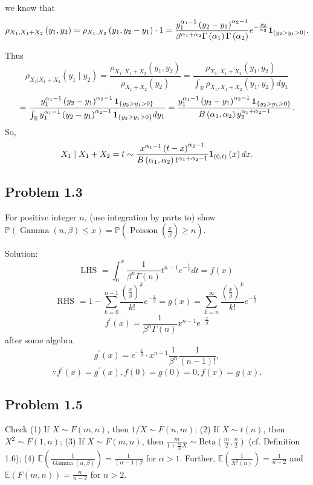 we know that
\[
\rho_{X_{1},X_{1}+X_{2}}\left(y_{1},y_{2}\right)=\rho_{X_{1},X_{2}}\left(y_{1},y_{2}-y_{1}\right)\cdot 1=\frac{y_{1}^{\alpha_{1}-1}\left(y_{2}-y_{1}\right)^{\alpha_{2}-1}}{\beta^{\alpha_{1}+\alpha_{2}}\Gamma\left(\alpha_{1}\right)\Gamma\left(\alpha_{2}\right)}e^{-\frac{y_{2}}{\alpha_{2}}}\mathbf{1}_{\left(y_{2}>y_{1}>0\right)}.
\]

Thus
\[
\rho_{X_{1}|X_{1}+X_{2}}\left(y_{1}\mid y_{2}\right) =\frac{\rho_{X_{1},X_{1}+X_{2}}\left(y_{1},y_{2}\right)}{\rho_{X_{1}+X_{2}}\left(y_{2}\right)}
=\frac{\rho_{X_{1},X_{1}+X_{2}}\left(y_{1},y_{2}\right)}{\int_{\mathbb{R}}\rho_{X_{1},X_{1}+X_{2}}\left(y_{1},y_{2}\right)dy_{1}}
\]
\[
=\frac{y_{1}^{\alpha_{1}-1}\left(y_{2}-y_{1}\right)^{\alpha_{2}-1} \mathbf{1}_{\{y_{2}>y_{1}>0\}}}{\int_{\mathbb{R}}y_{1}^{\alpha_{1}-1}\left(y_{2}-y_{1}\right)^{\alpha_{2}-1}\mathbf{1}_{\{y_{2}>y_{1}>0\}}dy_{1}}
=\frac{y_{1}^{\alpha_{1}-1}\left(y_{2}-y_{1}\right)^{\alpha_{2}-1} \mathbf{1}_{\{y_{2}>y_{1}>0\}}}{B\left(\alpha_{1},\alpha_{2}\right)y_{2}^{\alpha_{1}+\alpha_{2}-1}}.
\]
So, 
\[
X_{1}\mid X_{1}+X_{2}=t\sim\frac{x^{\alpha_{1}-1}\left(t-x\right)^{\alpha_{2}-1}}{B\left(\alpha_{1},\alpha_{2}\right)t^{\alpha_{1}+\alpha_{2}-1}}\mathbf{1}_{(0,t)}\left(x\right)dx.
\]

\subsection*{Problem 1.3}
For positive integer $n$, (use integration by parts to) show $\mathbb{P}(\operatorname{Gamma}(n,\beta)\leq x)=\mathbb{P}\left(\operatorname{Poisson}\left(\frac{x}{\beta}\right)\geq n\right)$.

{Solution:}
\[
\text{LHS }=\int_{0}^{x}\frac{1}{\beta^{n}\Gamma(n)}t^{n-1}e^{-\frac{t}{\beta}}dt=f(x)
\]
\[
\text{RHS }=1-\sum_{k=0}^{n-1}\frac{\left(\frac{x}{\beta}\right)^{k}}{k!}e^{-\frac{x}{\beta}}=g(x)=\sum_{k=n}^{\infty}\frac{\left(\frac{x}{\beta}\right)^{k}}{k!}e^{-\frac{x}{\beta}}
\]
\[
f^{\prime}(x)=\frac{1}{\beta^{n}\Gamma(n)}x^{n-1}e^{-\frac{x}{\beta}}
\]
after some algebra.
\[
g^{\prime}(x)=e^{-\frac{x}{\beta}}\cdot x^{n-1}\frac{1}{\beta^{n}}\frac{1}{\left(n-1\right)!},
\]
\[
\because f^{\prime}(x)=g^{\prime}(x),f(0)=g(0)=0,f(x)=g(x).
\]

\subsection*{Problem 1.5}
Check
(1) If $X\sim F(m,n)$, then $1/X\sim F(n,m)$;
(2) If $X\sim t(n)$, then $X^{2}\sim F(1,n)$;
(3) If $X\sim F(m,n)$, then $\frac{m}{1+\frac{m}{n}X}\sim\text{Beta}\left(\frac{m}{2},\frac{n}{2}\right)$ (cf. Definition 1.6);
(4) $\mathbb{E}\left(\frac{1}{\operatorname{Gamma}(\alpha,\beta)}\right)=\frac{1}{\left(\alpha-1\right)\beta}$ for $\alpha>1$. Further, $\mathbb{E}\left(\frac{1}{X^{2}(n)}\right)=\frac{1}{n-2}$ and $\mathbb{E}(F(m,n))=\frac{n}{n-2}$ for $n>2$.

